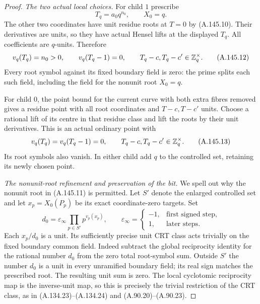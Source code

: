 \begin{proof}
\emph{The two actual local choices.}
For child \(1\) prescribe
\[
                        T_q=a_0q^{n_0},\qquad X_0=q.
\tag{A.145.11}
\]
The other two coordinates have unit residue roots at \(T=0\)
by (A.145.10).  Their derivatives are units, so they have
actual Hensel lifts at the displayed \(T_q\).
All coefficients are \(q\)-units.  Therefore
\[
     v_q(T_q)=n_0>0,\qquad v_q(T_q-1)=0,
       \qquad T_q-c,T_q-c'\in\mathbb Z_q^\times.
\tag{A.145.12}
\]
Every root symbol against its fixed boundary field is zero:
the prime splits each such field, including the field for
the nonunit root \(X_0=q\).

For child \(0\), the point bound for the current curve with
both extra fibres removed gives a residue point with all
root coordinates and \(T-c,T-c'\) units.  Choose a rational
lift of its centre in that residue class and lift the roots
by their unit derivatives.  This is an actual ordinary point
with
\[
          v_q(T_q)=v_q(T_q-1)=0,
                 \qquad T_q-c,T_q-c'\in\mathbb Z_q^\times.
\tag{A.145.13}
\]
Its root symbols also vanish.  In either child add \(q\) to
the controlled set, retaining its newly chosen point.

\emph{The nonunit-root refinement and preservation of the bit.}
We spell out why the nonunit root in (A.145.11) is permitted.
Let \(S'\) denote the enlarged controlled set and let
\(x_p=X_0(P_p)\) be its exact coordinate-zero targets.
Set
\[
          d_0=\varepsilon_\infty
                    \prod_{p\in S'}p^{v_p(x_p)},
       \qquad \varepsilon_\infty=
       \begin{cases}-1,&\text{first signed step},\\
                     1,&\text{later steps}.
       \end{cases}
\tag{A.145.14}
\]
Each \(x_p/d_0\) is a unit.  Its sufficiently precise unit
CRT class acts trivially on the fixed boundary common field.
Indeed subtract the global reciprocity identity for the
rational number \(d_0\) from the zero total root-symbol sum.
Outside \(S'\) the number \(d_0\) is a unit in every
unramified boundary field; its real sign matches the prescribed
root.  The resulting unit sum is zero.  The local cyclotomic
reciprocity map is the inverse-unit map, so this is precisely
the trivial restriction of the CRT class, as in
(A.134.23)--(A.134.24) and (A.90.20)--(A.90.23).


\end{proof}
